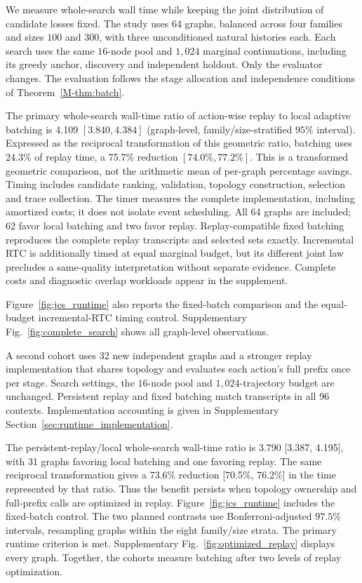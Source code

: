 \documentclass[preprint,11pt,sort&compress]{elsarticle}
\begin{document}
We measure whole-search wall time while keeping the joint distribution of candidate losses fixed. The study uses 64 graphs, balanced across four families and sizes $100$ and $300$, with three unconditioned natural histories each. Each search uses the same $16$-node pool and $1,024$ marginal continuations, including its greedy anchor, discovery and independent holdout. Only the evaluator changes. The evaluation follows the stage allocation and independence conditions of Theorem~\ref{M-thm:batch}.

The primary whole-search wall-time ratio of action-wise replay to local adaptive batching is 4.109 $[3.840,4.384]$ (graph-level, family/size-stratified $95\%$ interval). Expressed as the reciprocal transformation of this geometric ratio, batching uses 24.3\% of replay time, a 75.7\% reduction $[74.0\%,77.2\%]$. This is a transformed geometric comparison, not the arithmetic mean of per-graph percentage savings. Timing includes candidate ranking, validation, topology construction, selection and trace collection. The timer measures the complete implementation, including amortized costs; it does not isolate event scheduling. All 64 graphs are included; 62 favor local batching and two favor replay. Replay-compatible fixed batching reproduces the complete replay transcripts and selected sets exactly. Incremental RTC is additionally timed at equal marginal budget, but its different joint law precludes a same-quality interpretation without separate evidence. Complete costs and diagnostic overlap workloads appear in the supplement.

Figure~\ref{fig:jcs_runtime} also reports the fixed-batch comparison and the equal-budget incremental-RTC timing control. Supplementary Fig.~\ref{fig:complete_search} shows all graph-level observations.

A second cohort uses 32 new independent graphs and a stronger replay implementation that shares topology and evaluates each action's full prefix once per stage. Search settings, the $16$-node pool and $1,024$-trajectory budget are unchanged. Persistent replay and fixed batching match transcripts in all 96 contexts. Implementation accounting is given in Supplementary Section~\ref{sec:runtime_implementation}.

The persistent-replay/local whole-search wall-time ratio is 3.790 [3.387, 4.195], with 31 graphs favoring local batching and one favoring replay. The same reciprocal transformation gives a 73.6\% reduction [70.5\%, 76.2\%] in the time represented by that ratio. Thus the benefit persists when topology ownership and full-prefix calls are optimized in replay. Figure~\ref{fig:jcs_runtime} includes the fixed-batch control. The two planned contrasts use Bonferroni-adjusted $97.5\%$ intervals, resampling graphs within the eight family/size strata. The primary runtime criterion is met. Supplementary Fig.~\ref{fig:optimized_replay} displays every graph. Together, the cohorts measure batching after two levels of replay optimization.
\end{document}
